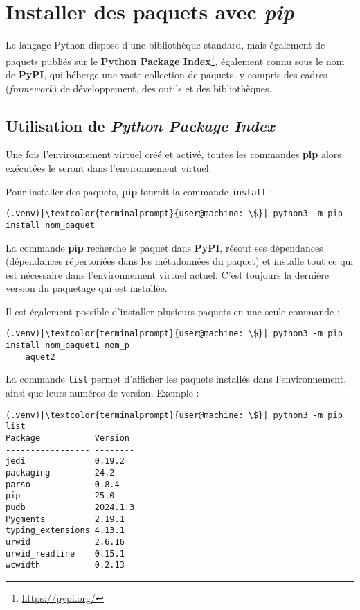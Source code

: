 \section{Installer des paquets avec \textit{pip}}
Le langage Python dispose d'une bibliothèque standard, mais également de paquets publiés sur le \textbf{Python Package Index}\footnote{\url{https://pypi.org/}}, également connu sous le nom de \textbf{PyPI}, qui  héberge une vaste collection de paquets, y compris des cadres (\textit{framework}) de développement, des outils et des bibliothèques.

\subsection*{Utilisation de \textit{Python Package Index}}
Une fois l'environnement virtuel créé et activé, toutes les commandes \textbf{pip} alors exécutées le seront dans l'environnement virtuel.

Pour installer des paquets, \textbf{pip} fournit la commande \texttt{install} : 
\begin{lstlisting}[style=terminal]
(.venv)|\textcolor{terminalprompt}{user@machine: \$}| python3 -m pip install nom_paquet
\end{lstlisting}

La commande \textbf{pip} recherche le paquet dans \textbf{PyPI}, résout ses dépendances (dépendances répertoriées dans les métadonnées du paquet) et installe tout ce qui est nécessaire dans l'environnement virtuel actuel. C'est toujours la dernière version du paquetage qui est installée. 

Il est également possible d'installer plusieurs paquets en une seule commande :
\begin{lstlisting}[style=terminal]
(.venv)|\textcolor{terminalprompt}{user@machine: \$}| python3 -m pip install nom_paquet1 nom_p
    aquet2
\end{lstlisting}

La commande \texttt{list} permet d'afficher les paquets installés dans l'environnement, ainsi que leurs numéros de version. Exemple :
\begin{lstlisting}[style=terminal]
(.venv)|\textcolor{terminalprompt}{user@machine: \$}| python3 -m pip list
Package           Version
----------------- --------
jedi              0.19.2
packaging         24.2
parso             0.8.4
pip               25.0
pudb              2024.1.3
Pygments          2.19.1
typing_extensions 4.13.1
urwid             2.6.16
urwid_readline    0.15.1
wcwidth           0.2.13
\end{lstlisting}

